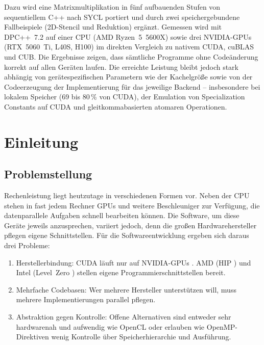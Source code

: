 \documentclass[12pt,a4paper]{article}
\begin{document}
Dazu wird eine Matrixmultiplikation in fünf aufbauenden Stufen von sequentiellem C++ nach SYCL portiert und durch zwei speichergebundene Fallbeispiele (2D-Stencil und Reduktion) ergänzt. Gemessen wird mit DPC++~7.2 auf einer CPU (AMD Ryzen~5~5600X) sowie drei NVIDIA-GPUs (RTX~5060~Ti, L40S, H100) im direkten Vergleich zu nativem CUDA, cuBLAS und CUB\@. Die Ergebnisse zeigen, dass sämtliche Programme ohne Codeänderung korrekt auf allen Geräten laufen. Die erreichte Leistung bleibt jedoch stark abhängig von gerätespezifischen Parametern wie der Kachelgröße sowie von der Codeerzeugung der Implementierung für das jeweilige Backend -- insbesondere bei lokalem Speicher (69 bis 80\,\% von CUDA), der Emulation von Specialization Constants auf CUDA und gleitkommabasierten atomaren Operationen.

\newpage
\tableofcontents
\newpage
\listoffigures
\listoftables
\newpage


\section{Einleitung}\label{sec:einleitung}

\subsection{Problemstellung}\label{sec:problem}

Rechenleistung liegt heutzutage in verschiedenen Formen vor. Neben der CPU
stehen in fast jedem Rechner GPUs und weitere Beschleuniger zur Verfügung, die
datenparallele Aufgaben schnell bearbeiten können. Die Software, um diese
Geräte jeweils anzusprechen, variiert jedoch, denn die großen Hardwarehersteller
pflegen eigene Schnittstellen. Für die Softwareentwicklung ergeben sich daraus
drei Probleme:

\begin{enumerate}[nosep]
    \item Herstellerbindung: CUDA läuft nur auf NVIDIA-GPUs
    \cite{nickolls2008cuda}. AMD (HIP \cite{amd_hip}) und Intel (Level~Zero
    \cite{intel_level_zero}) stellen eigene Programmierschnittstellen bereit.
    \item Mehrfache Codebasen: Wer mehrere Hersteller unterstützen
    will, muss mehrere Implementierungen parallel pflegen.
    \item Abstraktion gegen Kontrolle: Offene Alternativen sind
    entweder sehr hardwarenah und aufwendig wie OpenCL
    \cite{stone2010opencl} oder erlauben wie OpenMP-Direktiven \cite{openmp_spec}
    wenig Kontrolle über Speicherhierarchie und Ausführung.
\end{enumerate}
\end{document}
